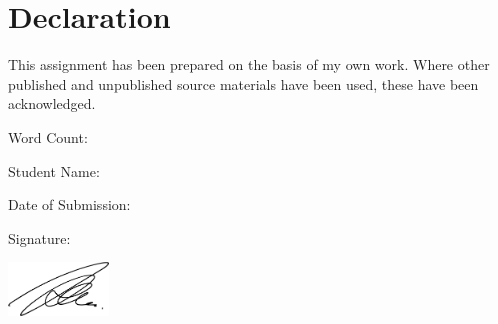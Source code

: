 \chapter*{Declaration}
\thispagestyle{empty}

This assignment has been prepared on the basis of my own work. Where other published and unpublished source materials have been used, these have been acknowledged.

\vfill

Word Count: \wordcount

\vspace{0.4em}

Student Name: \studentname

\vspace{0.4em}

Date of Submission: \submitdate

\vspace{0.4em}

Signature:

\includegraphics[width=0.2\textwidth]{./images/root/signature.png}
